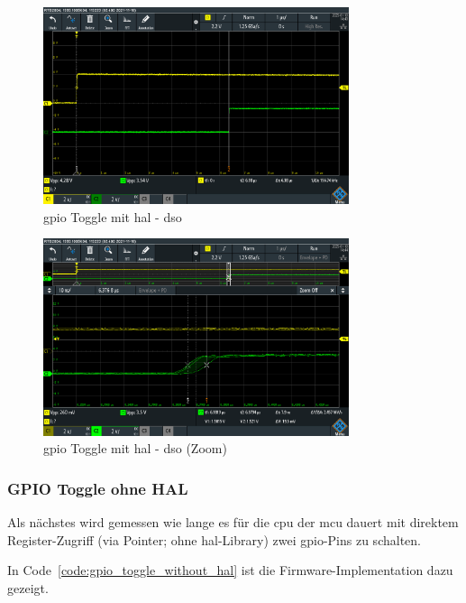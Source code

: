 \documentclass[11pt,a4paper,hidelinks]{article}
\begin{document}
\begin{figure}[H]
    \centering
    \includegraphics[width=0.8\textwidth]{graphics/gpio_toggle_with_hal_dso.png}
    \caption{\acrshort{gpio} Toggle mit \acrshort{hal} - \acrshort{dso}}\label{fig:gpio_toggle_with_hal_dso}
\end{figure}

\begin{figure}[H]
    \centering
    \includegraphics[width=0.8\textwidth]{graphics/gpio_toggle_with_hal_dso_zoom.png}
    \caption{\acrshort{gpio} Toggle mit \acrshort{hal} - \acrshort{dso} (Zoom)}\label{fig:gpio_toggle_with_hal_dso_zoom}
\end{figure}

\subsubsection{GPIO Toggle ohne HAL}

Als nächstes wird gemessen wie lange es für die \acrshort{cpu} der \acrshort{mcu} dauert mit direktem Register-Zugriff
(via Pointer; ohne \acrshort{hal}-Library) zwei \acrshort{gpio}-Pins zu schalten.

In Code~\ref{code:gpio_toggle_without_hal} ist die Firmware-Implementation dazu gezeigt.
\end{document}
